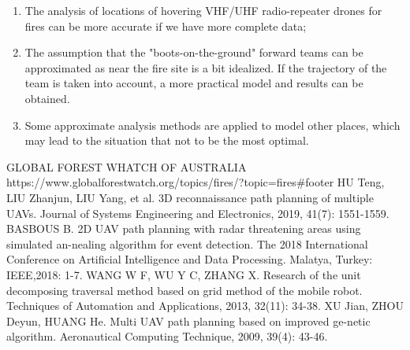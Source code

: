 \documentclass[12pt]{article}  %
\begin{document}
 \begin{enumerate}[\bfseries 1.]
     \setlength{\parsep}{0ex} %
     \setlength{\topsep}{0ex} %
     \setlength{\itemsep}{0ex} %
     \item The analysis of locations of hovering VHF/UHF radio-repeater drones for fires can be more accurate if we have more complete data;
     \item The assumption that the "boots-on-the-ground" forward teams can be approximated as near the fire site is a bit idealized. If the trajectory of the team is taken into account, a more practical model and results can be obtained.
     \item Some approximate analysis methods are applied to model other places, which may lead to the situation that not to be the most optimal.
 \end{enumerate}
 
 \clearpage   %
 \begin{thebibliography}{99}
      GLOBAL FOREST WHATCH OF AUSTRALIA https://www.globalforestwatch.org/topics/fires/?topic=fires\#footer
      HU Teng, LIU Zhanjun, LIU Yang, et al. 3D reconnaissance path planning of multiple UAVs. Journal of Systems Engineering and Electronics, 2019, 41(7): 1551-1559.
      BASBOUS B. 2D UAV path planning with radar threatening areas using simulated an-nealing algorithm for event detection. The 2018 International Conference on Artificial Intelligence and Data Processing. Malatya, Turkey: IEEE,2018: 1-7.
      WANG W F, WU Y C, ZHANG X. Research of the unit decomposing traversal method based on grid method of the mobile robot. Techniques of Automation and Applications, 2013, 32(11): 34-38.
      XU Jian, ZHOU Deyun, HUANG He. Multi UAV path planning based on improved ge-netic algorithm. Aeronautical Computing Technique, 2009, 39(4): 43-46.
 
 \end{thebibliography}
 
 
\end{document}
